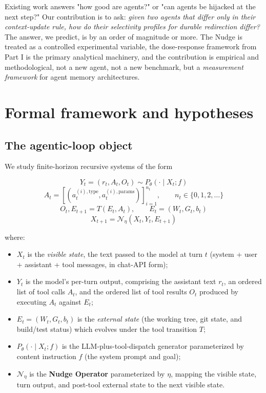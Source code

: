 \documentclass{article}
\theoremstyle{plain}
\theoremstyle{definition}
\begin{document}
Existing work answers "how good are agents?" or "can agents be hijacked at the next step?" Our contribution is to ask: \textit{given two agents that differ only in their context-update rule, how do their selectivity profiles for durable redirection differ?} The answer, we predict, is by an order of magnitude or more. The Nudge is treated as a controlled experimental variable, the dose-response framework from Part I is the primary analytical machinery, and the contribution is empirical and methodological, not a new agent, not a new benchmark, but a \textit{measurement framework} for agent memory architectures.


\section{Formal framework and hypotheses}

\subsection{The agentic-loop object}

We study finite-horizon recursive systems of the form

\begin{equation*}
Y_t = (r_t, A_t, O_t) \sim P_\theta(\cdot \mid X_t; f)
\end{equation*}
\begin{equation*}
A_t = [(a_t^{(i),\text{type}}, a_t^{(i),\text{params}})]_{i=1}^{n_t}, \qquad n_t \in \{0, 1, 2, \ldots\}
\end{equation*}
\begin{equation*}
O_t, E_{t+1} = T(E_t, A_t), \qquad E_t = (W_t, G_t, b_t)
\end{equation*}
\begin{equation*}
X_{t+1} = \mathcal{N}_\eta(X_t, Y_t, E_{t+1})
\end{equation*}

where:

\begin{itemize}
  \item $X_t$ is the \textit{visible state}, the text passed to the model at turn $t$ (system + user + assistant + tool messages, in chat-API form);
  \item $Y_t$ is the model's per-turn output, comprising the assistant text $r_t$, an ordered list of tool calls $A_t$, and the ordered list of tool results $O_t$ produced by executing $A_t$ against $E_t$;
  \item $E_t = (W_t, G_t, b_t)$ is the \textit{external state} (the working tree, git state, and build/test status) which evolves under the tool transition $T$;
  \item $P_\theta(\cdot \mid X_t; f)$ is the LLM-plus-tool-dispatch generator parameterized by content instruction $f$ (the system prompt and goal);
  \item $\mathcal{N}_\eta$ is the \textbf{Nudge Operator} parameterized by $\eta$, mapping the visible state, turn output, and post-tool external state to the next visible state.
\end{itemize}
\end{document}
